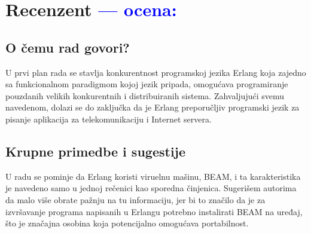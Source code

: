 \documentclass[a4paper]{report}
\newcommand{\odgovor}[1]{\textcolor{blue}{#1}}
\begin{document}
\chapter{Recenzent \odgovor{--- ocena:} }


\section{O čemu rad govori?}
U prvi plan rada se stavlja konkurentnost programskoj jezika Erlang koja zajedno sa funkcionalnom paradigmom kojoj jezik pripada, omogućava programiranje pouzdanih velikih konkurentnih i distribuiranih sistema. Zahvaljujući svemu navedenom, dolazi se do zaključka da je Erlang preporučljiv programski jezik za pisanje aplikacija za telekomunikaciju i Internet servera.
\section{Krupne primedbe i sugestije}
U radu se pominje da Erlang koristi viruelnu mašinu, BEAM, i ta karakteristika je navedeno samo u jednoj rečenici kao sporedna činjenica. Sugerišem autorima da malo više obrate pažnju na tu informaciju, jer bi to značilo da je za izvršavanje programa napisanih u Erlangu potrebno instalirati BEAM na uređaj, što je značajna osobina koja potencijalno omogućava portabilnost.
\end{document}
